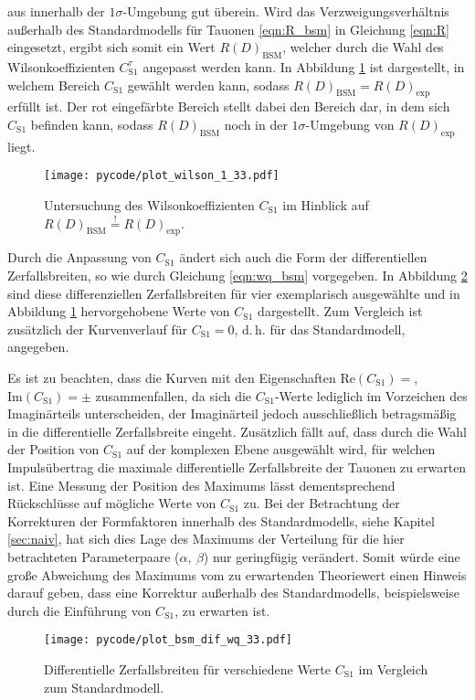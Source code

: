 aus \cite{Hiller2016} innerhalb der $\num{1}\sigma$-Umgebung gut überein.
Wird das Verzweigungsverhältnis außerhalb des Standardmodells für Tauonen \eqref{eqn:R_bsm} in Gleichung \eqref{eqn:R} eingesetzt, ergibt sich somit ein Wert $R(D)_{\text{BSM}}$, welcher durch die Wahl des Wilsonkoeffizienten $C_{\text{S}1}^{\tau}$ angepasst werden kann.
In Abbildung \ref{fig:wilson_1} ist dargestellt, in welchem Bereich $C_{\text{S}1}$ gewählt werden kann, sodass $R(D)_{\text{BSM}} = R(D)_{\text{exp}}$ erfüllt ist.
Der rot eingefärbte Bereich stellt dabei den Bereich dar, in dem sich $C_{\text{S}1}$ befinden kann, sodass $R(D)_{\text{BSM}}$ noch in der $\num{1}\sigma$-Umgebung von $R(D)_{\text{exp}}$ liegt.
\begin{figure}
  \centering
  \texttt{[image: pycode/plot\_wilson\_1\_33.pdf]}
  \caption{Untersuchung des Wilsonkoeffizienten $C_{\text{S}1}$ im Hinblick auf $R(D)_{\text{BSM}} \stackrel{!}{=} R(D)_{\text{exp}}$.}
  \label{fig:wilson_1}
\end{figure}
Durch die Anpassung von $C_{\text{S}1}$ ändert sich auch die Form der differentiellen Zerfallsbreiten, so wie durch Gleichung \eqref{eqn:wq_bsm} vorgegeben.
In Abbildung \ref{fig:wilson_2} sind diese differenziellen Zerfallsbreiten für vier exemplarisch ausgewählte und in Abbildung \ref{fig:wilson_1} hervorgehobene Werte von $C_{\text{S}1}$ dargestellt.
Zum Vergleich ist zusätzlich der Kurvenverlauf für $C_{\text{S}1} = \num{0}$, d.\,h. für das Standardmodell, angegeben.

Es ist zu beachten, dass die Kurven mit den Eigenschaften $\mathrm{Re}(C_{\text{S}1}) = $, $\mathrm{Im}(C_{\text{S}1}) = \pm$ zusammenfallen, da sich die $C_{\text{S}1}$-Werte lediglich im Vorzeichen des Imaginärteils unterscheiden, der Imaginärteil jedoch ausschließlich betragsmäßig in die differentielle Zerfallsbreite eingeht.
Zusätzlich fällt auf, dass durch die Wahl der Position von $C_{\text{S}1}$ auf der komplexen Ebene ausgewählt wird, für welchen Impulsübertrag die maximale differentielle Zerfallsbreite der Tauonen zu erwarten ist.
Eine Messung der Position des Maximums lässt dementsprechend Rückschlüsse auf mögliche Werte von $C_{\text{S}1}$ zu.
Bei der Betrachtung der Korrekturen der Formfaktoren innerhalb des Standardmodells, siehe Kapitel \ref{sec:naiv}, hat sich dies Lage des Maximums der Verteilung für die hier betrachteten Parameterpaare ($\alpha,\: \beta$) nur geringfügig verändert.
Somit würde eine große Abweichung des Maximums vom zu erwartenden Theoriewert einen Hinweis darauf geben, dass eine Korrektur außerhalb des Standardmodells, beispielsweise durch die Einführung von $C_{\text{S}1}$, zu erwarten ist.

\begin{figure}
  \centering
  \texttt{[image: pycode/plot\_bsm\_dif\_wq\_33.pdf]}
  \caption{Differentielle Zerfallsbreiten für verschiedene Werte $C_{\text{S}1}$ im Vergleich zum Standardmodell.}
  \label{fig:wilson_2}
\end{figure}
